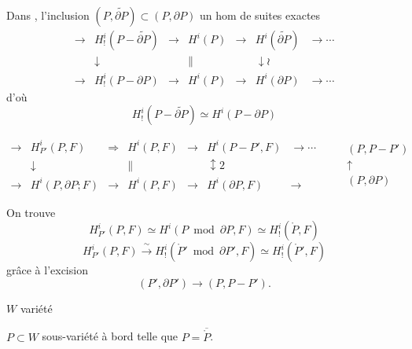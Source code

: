 \documentclass[11pt,a4paper]{article}
\begin{document}
Dans \ill{}, l'inclusion $(P, \widetilde{\partial P}) \subset (P, \partial P)$
\ill{} un hom de suites exactes
\[
  \begin{array}{ccccccc}
    \to & H^{i}_{!}(P - \widetilde{\partial P}) & \to & H^{i}(P) & \to & H^{i}(\widetilde{\partial P}) & \to \cdots \\
        & \downarrow & & \| & & \downarrow{\wr} & \\
    \to & H^{i}_{!}(P - \partial P) & \to & H^{i}(P) & \to & H^{i}(\partial P) & \to \cdots
  \end{array}
\]
d'où \ill{} \ill{} \ill{} \ill{}
\[
  H^{i}_{!}(P - \widetilde{\partial P}) \simeq H^{i}(P - \partial P)
\]

\[
  \begin{array}{ccccccc}
    \to & H^{i}_{P'}(P, F) & \Longrightarrow & H^{i}(P, F) & \to & H^{i}(P - P', F) & \to \cdots \\
        & \downarrow & & \| & & \updownarrow{\scriptstyle 2} & \\
    \to & H^{i}(P, \partial P; F) & \longrightarrow & H^{i}(P, F) & \to & H^{i}(\partial P, F) & \to
  \end{array}
  \qquad
  \begin{array}{c} (P, P - P') \\ \uparrow \\ (P, \partial P) \end{array}
\]

On trouve
\[
  H^{i}_{P'}(P, F) \simeq H^{i}(P \bmod \partial P, F) \simeq H^{i}_{!}(\mathring{P}, F)
\]
\ill{} \ill{} \ill{}
\[
  H^{i}_{P'}(P, F) \xrightarrow{\ \sim\ } H^{i}_{!}(\mathring{P}' \bmod \partial P', F)
  \simeq H^{i}_{!}(\mathring{P}', F)
\]
grâce à l'excision
\[
  (P', \partial P') \to (P, P - P') .
\]


$W$ variété \struck{\ill{}}

$P \subset W$ sous-variété à bord telle que $P = \overline{\mathring{P}}$.
\end{document}
